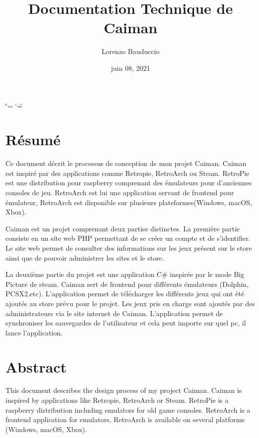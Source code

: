 \documentclass[a4paper,12pt,french]{sphinxmanual}
\title{Documentation Technique de Caiman}
\date{juin 08, 2021}
\author{Lorenzo Bauduccio}
\begin{document}
\ifdefined\shorthandoff
  \ifnum\catcode`\=\string=\active\shorthandoff{=}\fi
  \ifnum\catcode`\"=\active{}\fi
\fi

\pagestyle{empty}
\sphinxmaketitle
\pagestyle{plain}
\sphinxtableofcontents
\pagestyle{normal}
\label{\detokenize{index::doc}}



\chapter{Résumé}
\label{\detokenize{resume:resume}}\label{\detokenize{resume::doc}}
\sphinxAtStartPar
Ce document décrit le processus de conception de mon projet Caiman. Caiman est inspiré par des applications comme Retropie, RetroArch ou Steam. RetroPie est une distribution pour raspberry comprenant des émulateurs pour d’anciennes consoles de jeu. RetroArch est lui une application servant de frontend pour émulateur, RetroArch est disponible sur plusieurs plateformes(Windows, macOS, Xbox).

\sphinxAtStartPar
Caiman est un projet comprenant deux parties distinctes. La première partie consiste en un site web PHP permettant de se créer un compte et de s’identifier. Le site web permet de consulter des informations sur les jeux présent sur le store ainsi que de pouvoir administrer les sites et le store.

\sphinxAtStartPar
La deuxième partie du projet est une application C\# inspirée par le mode Big Picture de steam. Caiman sert de frontend pour différents émulateurs (Dolphin, PCSX2,etc). L’application permet de télécharger les différents jeux qui ont été ajoutés au store prévu pour le projet. Les jeux pris en charge sont ajoutés par des administrateurs via le site internet de Caiman. L’application permet de synchroniser les sauvegardes de l’utilisateur et cela peut importe sur quel pc, il lance l’application.


\chapter{Abstract}
\label{\detokenize{resume:abstract}}
\sphinxAtStartPar
This document describes the design process of my project Caiman. Caiman is inspired by applications like Retropie, RetroArch or Steam. RetroPie is a raspberry distribution including emulators for old game consoles. RetroArch is a frontend application for emulators, RetroArch is available on several platforms (Windows, macOS, Xbox).
\end{document}
